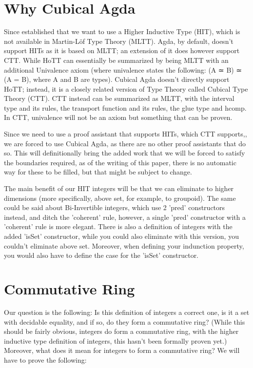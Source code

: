 \section{Why Cubical Agda}

Since established that we want to use a Higher Inductive Type (HIT), which is not available in Martin-Löf Type Theory (MLTT). Agda, by default, doesn't support HITs as it is based on MLTT; an extension of it does however support CTT. While HoTT can essentially be summarized\cite{hottbook} by being MLTT with an additional Univalence axiom (where univalence states the following: (A ≃ B) ≃ (A = B), where A and B are types). Cubical Agda doesn't directly support HoTT; instead, it is a closely related version of Type Theory called Cubical Type Theory (CTT). CTT instead can be summarized as MLTT, with the interval type and its rules, the transport function and its rules, the glue type and hcomp. In CTT, univalence will not be an axiom but something that can be proven\cite{cohen2016cubicaltypetheoryconstructive}.

Since we need to use a proof assistant that supports HITs, which CTT supports,\cite{coquand2018higherinductivetypescubical}, we are forced to use Cubical Agda\cite{10.1145/3341691}, as there are no other proof assistants that do so. This will definitionally bring the added work that we will be forced to satisfy the boundaries required, as of the writing of this paper, there is no automatic way for these to be filled, but that might be subject to change\cite{doré2024automatingboundaryfillingcubical}.

The main benefit of our HIT integers will be that we can eliminate to higher dimensions (more specifically, above set, for example, to groupoid). The same could be said about Bi-Invertible integers, which use 2 'pred' constructors instead, and ditch the 'coherent' rule, however, a single 'pred' constructor with a 'coherent' rule is more elegant. There is also a definition of integers with the added 'isSet' constructor, while you could also eliminate with this version, you couldn't eliminate above set. Moreover, when defining your indunction property, you would also have to define the case for the 'isSet' constructor.

\section{Commutative Ring}

Our question is the following: Is this definition of integers a correct one, is it a set with decidable equality, and if so, do they form a commutative ring? (While this should be fairly obvious, integers do form a commutative ring, with the higher inductive type definition of integers, this hasn't been formally proven yet.) Moreover, what does it mean for integers to form a commutative ring? We will have to prove the following:

